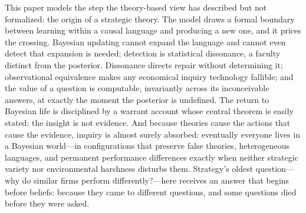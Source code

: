 This paper models the step the theory-based view has described but not
formalized: the origin of a strategic theory.  The model draws a formal
boundary between learning within a causal language and producing a new one,
and it prices the crossing.  Bayesian updating cannot expand the language
and cannot even detect that expansion is needed; detection is statistical
dissonance, a faculty distinct from the posterior.  Dissonance directs
repair without determining it; observational equivalence makes any
economical inquiry technology fallible; and the value of a question is
computable, invariantly across its inconceivable answers, at exactly the
moment the posterior is undefined.  The return to Bayesian life is
disciplined by a warrant account whose central theorem is easily stated: the
insight is not evidence.  And because theories cause the actions that cause
the evidence, inquiry is almost surely absorbed: eventually everyone lives
in a Bayesian world---in configurations that preserve false theories,
heterogeneous languages, and permanent performance differences exactly when
neither strategic variety nor environmental harshness disturbs them.
Strategy's oldest question---why do similar firms perform differently?---here
receives an answer that begins before beliefs: because they came to
different questions, and some questions died before they were asked.
